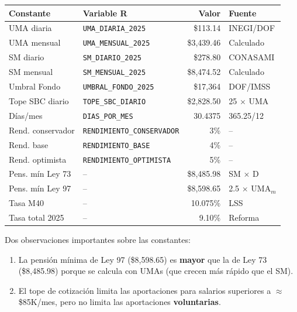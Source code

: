 \documentclass[11pt,a4paper]{report}
\theoremstyle{remark}
\begin{document}
\begin{tcolorbox}[colback=blue!5!white, colframe=blue!75!black, title=\textbf{Definici\'on Formal}]
\begin{center}
\begin{longtable}{llrl}
\toprule
Constante & Variable R & Valor & Fuente \\
\midrule
\endhead
UMA diaria & \texttt{UMA\_DIARIA\_2025} & \$113.14 & INEGI/DOF \\
UMA mensual & \texttt{UMA\_MENSUAL\_2025} & \$3,439.46 & Calculado \\
SM diario & \texttt{SM\_DIARIO\_2025} & \$278.80 & CONASAMI \\
SM mensual & \texttt{SM\_MENSUAL\_2025} & \$8,474.52 & Calculado \\
Umbral Fondo & \texttt{UMBRAL\_FONDO\_2025} & \$17,364 & DOF/IMSS \\
Tope SBC diario & \texttt{TOPE\_SBC\_DIARIO} & \$2,828.50 & 25 $\times$ UMA \\
D\'ias/mes & \texttt{DIAS\_POR\_MES} & 30.4375 & 365.25/12 \\
Rend. conservador & \texttt{RENDIMIENTO\_CONSERVADOR} & 3\% & -- \\
Rend. base & \texttt{RENDIMIENTO\_BASE} & 4\% & -- \\
Rend. optimista & \texttt{RENDIMIENTO\_OPTIMISTA} & 5\% & -- \\
Pens. m\'in Ley 73 & -- & \$8,485.98 & SM $\times$ D \\
Pens. m\'in Ley 97 & -- & \$8,598.65 & 2.5 $\times$ UMA$_m$ \\
Tasa M40 & -- & 10.075\% & LSS \\
Tasa total 2025 & -- & 9.10\% & Reforma \\
\bottomrule
\end{longtable}
\end{center}
\end{tcolorbox}

\begin{tcolorbox}[colback=green!5!white, colframe=green!50!black, title=\textbf{Intuici\'on}]
Dos observaciones importantes sobre las constantes:
\begin{enumerate}
  \item La pensi\'on m\'inima de Ley 97 (\$8,598.65) es \textbf{mayor} que la de Ley 73 (\$8,485.98) porque se calcula con UMAs (que crecen m\'as r\'apido que el SM).
  \item El tope de cotizaci\'on limita las aportaciones para salarios superiores a $\approx$\$85K/mes, pero no limita las aportaciones \textbf{voluntarias}.
\end{enumerate}
\end{tcolorbox}
\end{document}
